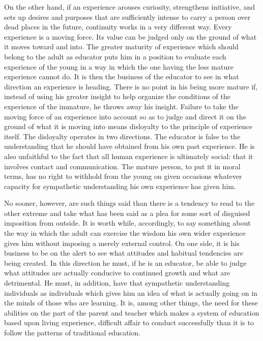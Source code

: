 On the other hand, if an experience arouses curiosity, strengthens initiative, and sets 
up desires and purposes that are sufficiently intense to carry a person over dead places in 
the future, continuity works in a very different way. Every experience is a moving force. 
Its value can be judged only on the ground of what it moves toward and into. The greater 
maturity of experience which should belong to the adult as educator puts him in a 
position to evaluate each experience of the young in a way in which the one having the 
less mature experience cannot do. It is then the business of the educator to see in what 
direction an experience is heading. There is no point in his being more mature if, instead 
of using his greater insight to help organize the conditions of the experience of the 
immature, he throws away his insight. Failure to take the moving force of an experience 
into account so as to judge and direct it on the ground of what it is moving into means 
disloyalty to the principle of experience itself. The disloyalty operates in two directions. 
The educator is false to the understanding that he should have obtained from his own past 
experience. He is also unfaithful to the fact that all human experience is ultimately social: 
that it involves contact and communication. The mature person, to put it in moral terms, 
has no right to withhold from the young on given occasions whatever capacity for 
sympathetic understanding his own experience has given him. 

No sooner, however, are such things said than there is a tendency to read to the other 
extreme and take what has been said as a plea for some sort of disguised imposition from 
outside. It is worth while, accordingly, to say something about the way in which the adult 
can exercise the wisdom his own wider experience gives him without imposing a merely 
external control. On one side, it is his business to be on the alert to see what attitudes and habitual tendencies are being created. In this direction he must, if he is an educator, be 
able to judge what attitudes are actually conducive to continued growth and what are 
detrimental. He must, in addition, have that sympathetic understanding ~ individuals as 
individuals which gives him an idea of what is actually going on in the minds of those 
who are learning. It is, among other things, the need for these abilities on the part of the 
parent and teacher which makes a system of education based upon living experience, 
difficult affair to conduct successfully than it is to follow the patterns of traditional 
education. 

